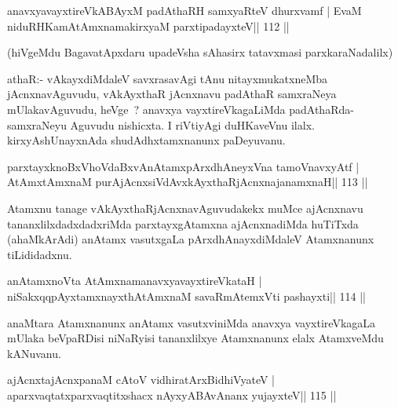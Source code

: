 \begin{shl}
anavxyavayxtireVkABAyxM padAthaRH samxyaRteV dhurxvamf |
EvaM niduRHKamAtAmxnamakirxyaM parxtipadayxteV\hfill || 112 ||
\end{shl}

\begin{artha}
(hiVgeMdu BagavatApxdaru upadeVsha sAhasirx tatavxmasi
  parxkaraNadalilx) 
\end{artha}

\begin{artha}
athaR:- vAkayxdiMdaleV savxrasavAgi tAnu nitayxmukatxneMba jAcnxnavAguvudu, vAkAyxthaR jAcnxnavu padAthaR samxraNeya mUlakavAguvudu, heVge~? anavxya vayxtireVkagaLiMda padAthaRda-samxraNeyu Aguvudu nishicxta. I riVtiyAgi duHKaveVnu ilalx. kirxyAshUnayxnAda shudAdhxtamxnanunx paDeyuvanu.
\end{artha}

\centerline{}



\begin{shl}
parxtayxknoBxVhoVdaBxvAnAtamxpArxdhAneyxVna tamoVnavxyAtf |
AtAmx\s\s tAmxnaM purA\s jAcnxsiVdAvxkAyxthaRjAcnxnajanamxnaH\hfill || 113 ||
\end{shl}

\begin{artha}
Atamxnu tanage vAkAyxthaRjAcnxnavAguvudakekx muMce ajAcnxnavu tananxlilxdadxdadxriMda parxtayxgAtamxna ajAcnxnadiMda huTiTxda (ahaMkArAdi) anAtamx vasutxgaLa pArxdhAnayxdiMdaleV Atamxnanunx tiLididadxnu.
\end{artha}

\begin{shl}
anAtamxnoV\s ta AtAmxnamanavxyavayxtireVkataH |
niSakxqqpAyx\s\s tamxnayxthA\s\s tAmxnaM savaRmAtemxVti pashayxti\hfill || 114 ||
\end{shl}

\begin{artha}
anaMtara Atamxnanunx anAtamx vasutxviniMda anavxya vayxtireVkagaLa mUlaka beVpaRDisi niNaRyisi tananxlilxye Atamxnanunx elalx AtamxveMdu kANuvanu.
\end{artha}

\begin{shl}
\footnotemark[1]ajAcnxtajAcnxpanaM cAtoV vidhiratArxBidhiVyateV |
\footnotemark[2]aparxvaqtatxparxvaqtitxshacx nAyxyABAvAnanx yujayxteV\hfill || 115 ||
\end{shl}

